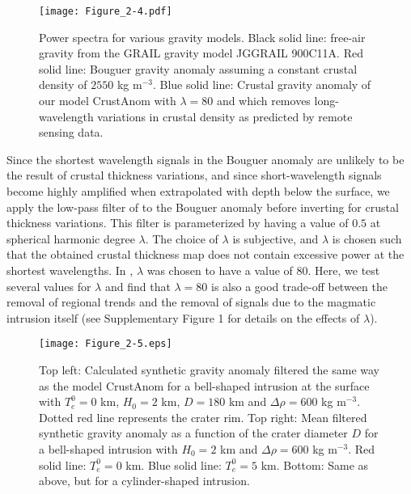 \begin{figure}[h!]
    \graphicspath{ {/Users/thorey/Documents/These/Projet/FFC/Gravi_GRAIL/Article/Papier/Proof/} }
  \begin{center}
    \texttt{[image: Figure\_2-4.pdf]}
    \caption{Power spectra  for various  gravity models.   Black solid
      line:  free-air gravity  from  the GRAIL  gravity model  JGGRAIL
      900C11A.   Red solid  line: Bouguer  gravity anomaly  assuming a
      constant  crustal density  of  $2550$ kg  m$^{-3}$.  Blue  solid
      line:  Crustal  gravity  anomaly  of our  model  CrustAnom  with
      $\lambda=80$  and which  removes  long-wavelength variations  in
      crustal density as predicted by remote sensing data.}
    \label{Figure2-4}
  \end{center}
\end{figure}

Since  the shortest  wavelength  signals in  the  Bouguer anomaly  are
unlikely to be  the result of crustal thickness  variations, and since
short-wavelength  signals become  highly  amplified when  extrapolated
with  depth  below  the  surface,  we apply  the  low-pass  filter  of
\citet{wieczorek:1998th} to  the Bouguer anomaly before  inverting for
crustal thickness variations.  This  filter is parameterized by having
a value of $0.5$ at spherical harmonic degree $\lambda$. The choice of
$\lambda$  is  subjective,  and  $\lambda$ is  chosen  such  that  the
obtained crustal thickness map does not contain excessive power at the
shortest  wavelengths.   In \citet{Wieczorek:2013ipa},  $\lambda$  was
chosen to  have a  value of  $80$.  Here, we  test several  values for
$\lambda$ and find that $\lambda=80$  is also a good trade-off between
the removal of  regional trends and the removal of  signals due to the
magmatic intrusion itself  (see Supplementary Figure 1  for details on
the effects of $\lambda$).

\begin{figure}[h!]
    \graphicspath{ {/Users/thorey/Documents/These/Projet/FFC/Gravi_GRAIL/Article/Papier/Proof/} }
  \begin{center}
    \texttt{[image: Figure\_2-5.eps]}
    \caption{Top left:  Calculated synthetic gravity  anomaly filtered
      the same way as the  model CrustAnom for a bell-shaped intrusion
      at the surface with  $T_e^0 = 0$ km, $H_0 = 2$ km,  $D = 180$ km
      and $\Delta \rho = 600$ kg m$^{-3}$.  Dotted red line represents
      the  crater  rim. Top  right:  Mean  filtered synthetic  gravity
      anomaly  as  a  function  of  the  crater  diameter  $D$  for  a
      bell-shaped intrusion with $H_0 = 2$  km and $\Delta \rho = 600$
      kg m$^{-3}$.  Red  solid line: $T_e^0 =0$ km.   Blue solid line:
      $T_e^0   =  5$   km.   Bottom:   Same  as   above,  but   for  a
      cylinder-shaped intrusion.}
    \label{Figure2-5}
  \end{center}
\end{figure}


